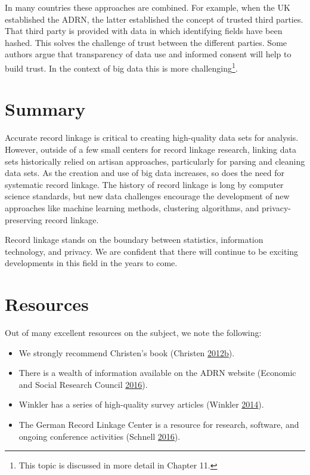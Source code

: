 \documentclass[]{krantz}
\begin{document}
In many countries these approaches are combined. For example, when the
UK established the ADRN, the latter established the concept of trusted
third parties. That third party is provided with data in which
identifying fields have been hashed. This solves the challenge of trust
between the different parties. Some authors argue that transparency of
data use and informed consent will help to build trust. In the context
of big data this is more challenging\footnote{This topic is discussed in
  more detail in Chapter 11.}.

\section{Summary}\label{summary}

Accurate record linkage is critical to creating high-quality data sets
for analysis. However, outside of a few small centers for record linkage
research, linking data sets historically relied on artisan approaches,
particularly for parsing and cleaning data sets. As the creation and use
of big data increases, so does the need for systematic record linkage.
The history of record linkage is long by computer science standards, but
new data challenges encourage the development of new approaches like
machine learning methods, clustering algorithms, and privacy-preserving
record linkage.

Record linkage stands on the boundary between statistics, information
technology, and privacy. We are confident that there will continue to be
exciting developments in this field in the years to come.

\section{Resources}\label{resources}

Out of many excellent resources on the subject, we note the following:

\begin{itemize}
\item
  We strongly recommend Christen's book (Christen
  \protect\hyperlink{ref-christen2012data}{2012}\protect\hyperlink{ref-christen2012data}{b}).
\item
  There is a wealth of information available on the ADRN website
  (Economic and Social Research Council
  \protect\hyperlink{ref-EconomicandSocialResearchCouncil2016}{2016}).
\item
  Winkler has a series of high-quality survey articles (Winkler
  \protect\hyperlink{ref-WICS:WICS1317}{2014}).
\item
  The German Record Linkage Center is a resource for research, software,
  and ongoing conference activities (Schnell
  \protect\hyperlink{ref-Schnell2016}{2016}).
\end{itemize}
\end{document}
